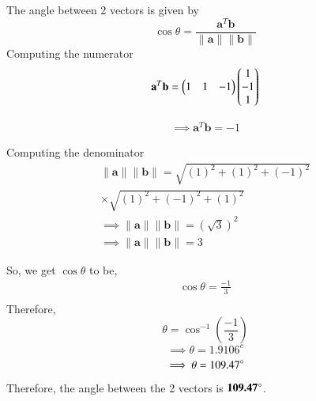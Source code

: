 The angle between 2 vectors is given by\\
$$
\cos \theta = \frac{\textbf{a}^T\textbf{b}}{\|\textbf{a}\|  \|\textbf{b}\|}
$$
Computing the numerator \\
\begin{align*}
\textbf{a}^T\textbf{b} = 
\begin{pmatrix}
1 & 1 & -1 
\end{pmatrix}
\begin{pmatrix}
1 \\
-1 \\
1
\end{pmatrix}
\end{align*}

\begin{align}
    \implies \textbf{a}^T\textbf{b} = -1 
\end{align}

Computing the denominator \\
\begin{align}
\|\textbf{a}\|  \|\textbf{b}\| = 
\sqrt{(1)^2 + (1)^2 + (-1)^2} 
\\
\times \sqrt{(1)^2 + (-1)^2 + (1)^2}\\
\implies \|\textbf{a}\|  \|\textbf{b}\| = (\sqrt{3})^2\\
\implies \|\textbf{a}\|  \|\textbf{b}\| = 3
\end{align}

So, we get $\cos{\theta}$ to be, 
\begin{align}
\cos \theta = \frac{-1}{3}\\
\end{align}
Therefore,
$$ \theta = \cos^{-1} \left( \frac{-1}{3} \right)$$
$$\implies \theta = 1.9106^c$$
$$\implies \theta = 109.47\degree $$

Therefore, the angle between the 2 vectors is $\textbf{109.47\degree}$.

